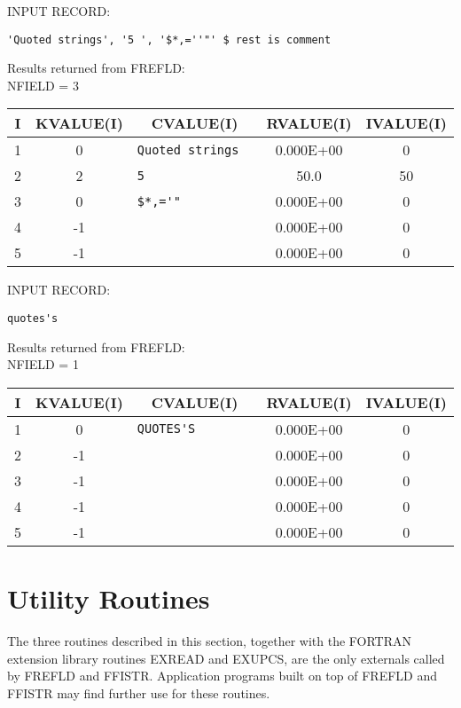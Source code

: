 INPUT RECORD:
\begin{verbatim}
'Quoted strings', '5 ', '$*,=''"' $ rest is comment
\end{verbatim}

Results returned from FREFLD:\\  
NFIELD =    3

\begin{tabular}{|ccccc|} \hline \hline
I    &  KVALUE(I) &       CVALUE(I)       &   RVALUE(I)   &  IVALUE(I)\\\hline
1  &  0  &\verb*"Quoted strings  "  &    0.000E+00 &  0\\
2  &  2  &\verb*"5               "  &     50.0     &  50\\
3  &  0  &\verb*+$*,='"          +  &    0.000E+00 &  0\\
4  & -1  &\verb*"                "  &    0.000E+00 &  0\\
5  & -1  &\verb*"                "  &    0.000E+00 &  0\\ \hline \hline
\end{tabular}

INPUT RECORD:
\begin{verbatim}
quotes's
\end{verbatim}

Results returned from FREFLD:\\  
NFIELD =    1

\begin{tabular}{|ccccc|} \hline \hline
I    &  KVALUE(I) &       CVALUE(I)       &   RVALUE(I)   &  IVALUE(I)\\\hline
1 &   0  &\verb*"QUOTES'S        "  &    0.000E+00 &  0\\
2 &  -1  &\verb*"                "  &    0.000E+00 &  0\\
3 &  -1  &\verb*"                "  &    0.000E+00 &  0\\
4 &  -1  &\verb*"                "  &    0.000E+00 &  0\\
5 &  -1  &\verb*"                "  &    0.000E+00 &  0\\ \hline \hline
\end{tabular}

\section{Utility Routines}
The three routines described in this section, together with the FORTRAN
extension library routines EXREAD and EXUPCS, are the only externals called
by FREFLD and FFISTR. Application programs built on top of FREFLD and FFISTR
may find further use for these routines.


